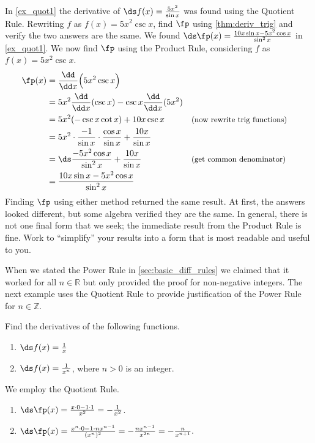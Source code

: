 \begin{example}\label{ex_prod_quot}
In \autoref{ex_quot1} the derivative of $\ds f(x) = \frac{5x^2}{\sin x}$ was found using the Quotient Rule. Rewriting $f$ as $f(x) = 5x^2\csc x$, find $\fp$ using \autoref{thm:deriv_trig} and verify the two answers are the same.
\solution
We found $\ds \fp(x) = \frac{10x\sin x - 5x^2\cos x}{\sin^2 x}$ in \autoref{ex_quot1}. We now find $\fp$ using the Product Rule, considering $f$ as $f(x) = 5x^2\csc x$.
\begin{align*}
	\fp(x)
	&= \frac{\dd}{\dd x}\Bigl(5x^2\csc x\Bigr) \\
	& = 5x^2 \frac{\dd}{\dd x} (\csc x) - \csc x \frac{\dd}{\dd x}(5x^2) \\
	&= 5x^2(-\csc x\cot x) + 10x\csc x && \text{\small (now rewrite trig functions)}\\
	&= 5x^2\cdot \frac{-1}{\sin x}\cdot \frac{\cos x}{\sin x} + \frac{10x}{\sin x}\\
	&= \ds\frac{-5x^2\cos x}{\sin ^2x}+\frac{10x}{\sin x} && \text{\small (get common denominator)}\\
	&= \frac{10x\sin x - 5x^2\cos x}{\sin^2x}
\end{align*}
Finding $\fp$ using either method returned the same result. At first, the answers looked different, but some algebra verified they are the same. In general, there is not one final form that we seek; the immediate result from the Product Rule is fine. Work to ``simplify\primeskip'' your results into a form that is most readable and useful to you.
\end{example}

When we stated the Power Rule in \autoref{sec:basic_diff_rules} we claimed that it worked for all $n\in\mathbb{R}$ but only provided the proof for non-negative integers. The next example uses the Quotient Rule to provide justification of the Power Rule for  $n\in\mathbb{Z}$.

\begin{example}\label{ex_deriv_power}
Find the derivatives of the following functions. 
\begin{enumerate}
	\item	$\ds f(x) = \frac{1}{x}$
	\item	$\ds f(x)= \frac{1}{x^n}$, where $n>0$ is an integer.
\end{enumerate}
\solution
We employ the Quotient Rule.
\begin{enumerate}
	\item	$\ds \fp(x) = \frac{x\cdot 0 - 1\cdot 1}{x^2} = -\frac{1}{x^2}$.
	\item	$\ds \fp(x) = \frac{x^n\cdot 0 - 1\cdot nx^{n-1}}{(x^n)^2} = -\frac{nx^{n-1}}{x^{2n}} = -\frac{n}{x^{n+1}}.$
\end{enumerate}
\end{example}

